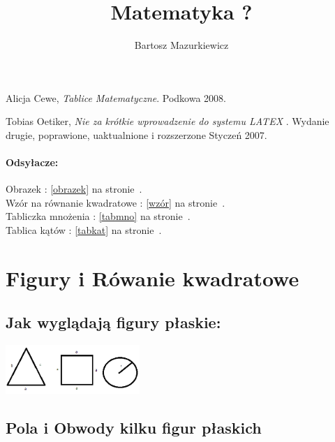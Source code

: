 \documentclass[a4paper]{article}
\title{Matematyka ?}
\author{Bartosz Mazurkiewicz}
\begin{document}
\maketitle
\noindent
\begin{thebibliography}{2}

  Alicja Cewe,
  \emph{Tablice Matematyczne}.
Podkowa
2008.

  Tobias Oetiker,
  \emph{Nie za krótkie wprowadzenie do systemu LATEX }.
Wydanie drugie, poprawione, uaktualnione i rozszerzone
Styczeń 2007.
\end{thebibliography}

\paragraph{Odsyłacze:} 

Obrazek : \ref{obrazek} na stronie~\pageref{obrazek}.\\
Wzór na równanie kwadratowe : \ref{wzór} na stronie~\pageref{wzór}. \\
Tabliczka mnożenia : \ref{tabmno} na stronie~\pageref{tabmno}. \\
Tablica kątów : \ref{tabkat} na stronie~\pageref{tabkat}. \\


\section{Figury i Rówanie kwadratowe}
\subsection{Jak wyglądają figury płaskie: }
\includegraphics[width=2in]{k} \label{obrazek}
	\subsection{Pola i Obwody kilku figur płaskich}
\end{document}
